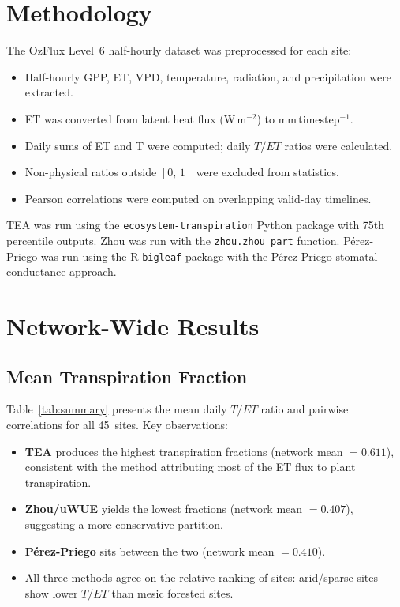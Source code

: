 \documentclass[11pt,a4paper]{article}
\begin{document}
\section{Methodology}
The OzFlux Level~6 half-hourly dataset was preprocessed for each site:
\begin{itemize}
  \item Half-hourly GPP, ET, VPD, temperature, radiation, and precipitation were extracted.
  \item ET was converted from latent heat flux (W\,m$^{-2}$) to mm\,timestep$^{-1}$.
  \item Daily sums of ET and T were computed; daily $T/ET$ ratios were calculated.
  \item Non-physical ratios outside $[0,\,1]$ were excluded from statistics.
  \item Pearson correlations were computed on overlapping valid-day timelines.
\end{itemize}
TEA was run using the \texttt{ecosystem-transpiration} Python package with 75th percentile
outputs. Zhou was run with the \texttt{zhou.zhou\_part} function. P\'erez-Priego was run
using the R \texttt{bigleaf} package with the Pérez-Priego stomatal conductance approach.

\section{Network-Wide Results}

\subsection{Mean Transpiration Fraction}
Table~\ref{tab:summary} presents the mean daily $T/ET$ ratio and pairwise correlations
for all 45~sites. Key observations:
\begin{itemize}
  \item \textbf{TEA} produces the highest transpiration fractions (network mean $= 0.611$),
  consistent with the method attributing most of the ET flux to plant transpiration.
  \item \textbf{Zhou/uWUE} yields the lowest fractions (network mean $= 0.407$),
  suggesting a more conservative partition.
  \item \textbf{P\'erez-Priego} sits between the two (network mean $= 0.410$).
  \item All three methods agree on the relative ranking of sites: arid/sparse sites show lower
  $T/ET$ than mesic forested sites.
\end{itemize}
\end{document}
